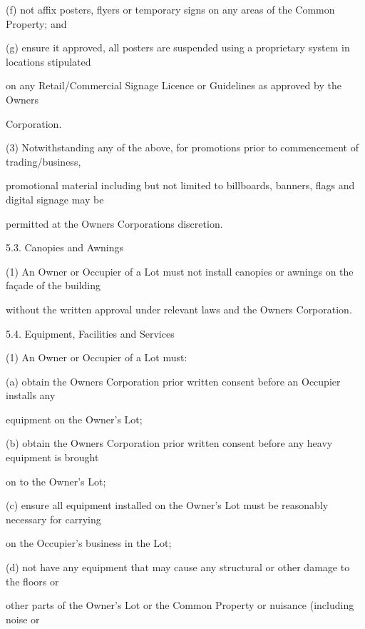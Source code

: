 \documentclass{article}
\begin{document}
{\fontsize{9.962}{1}(f) not affix posters, flyers or temporary signs on any areas of the Common Property; and }

{\fontsize{9.962}{1}(g) ensure it approved, all posters are suspended using a proprietary system in locations stipulated }

{\fontsize{10.02}{1}on any Retail/Commercial Signage Licence or Guidelines as approved by the Owners }

{\fontsize{10.02}{1}Corporation. }

{\fontsize{9.962}{1}(3) Notwithstanding any of the above, for promotions prior to commencement of trading/business, }

{\fontsize{10.02}{1}promotional material including but not limited to billboards, banners, flags and digital signage may be }

{\fontsize{10.02}{1}permitted at the Owners Corporations discretion. }

\newpage

{\fontsize{9.99}{1}5.3. Canopies and Awnings }

{\fontsize{9.962}{1}(1) An Owner or Occupier of a Lot must not install canopies or awnings on the façade of the building }

{\fontsize{10.02}{1}without the written approval under relevant laws and the Owners Corporation. }

{\fontsize{9.99}{1}5.4. Equipment, Facilities and Services }

{\fontsize{9.962}{1}(1) An Owner or Occupier of a Lot must: }

{\fontsize{9.962}{1}(a) obtain the Owners Corporation prior written consent before an Occupier installs any }

{\fontsize{10.02}{1}equipment on the Owner’s Lot; }

{\fontsize{9.962}{1}(b) obtain the Owners Corporation prior written consent before any heavy equipment is brought }

{\fontsize{10.02}{1}on to the Owner’s Lot; }

{\fontsize{9.962}{1}(c) ensure all equipment installed on the Owner’s Lot must be reasonably necessary for carrying }

{\fontsize{10.02}{1}on the Occupier’s business in the Lot; }

{\fontsize{9.962}{1}(d) not have any equipment that may cause any structural or other damage to the floors or }

{\fontsize{10.02}{1}other parts of the Owner’s Lot or the Common Property or nuisance (including noise or }
\end{document}
